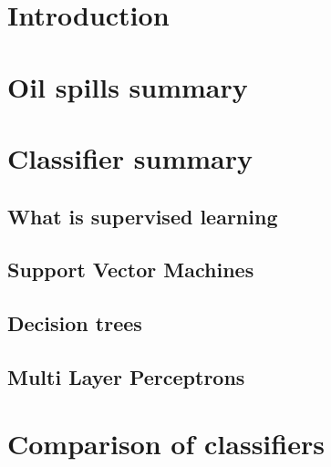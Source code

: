 \documentclass{article}
\begin{document}
\begin{multicols}{2} %

\section{Introduction}

  


\section{Oil spills summary}

%

%




\section{Classifier summary}

\subsection{What is supervised learning}
%

\subsection{Support Vector Machines}
%

\subsection{Decision trees}
%

\subsection{Multi Layer Perceptrons}
%


\section{Comparison of classifiers}

\end{multicols}
\end{document}
